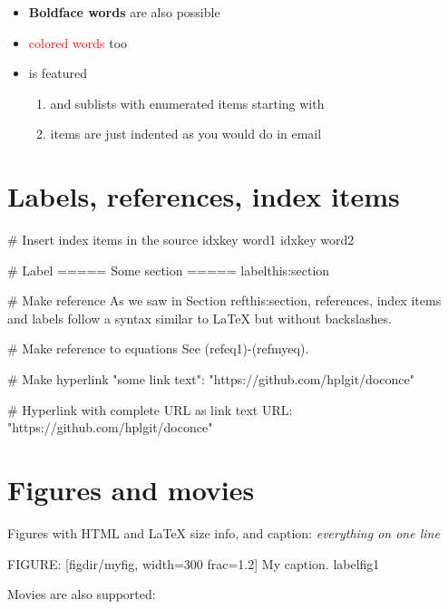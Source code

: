 \documentclass[%
twoside,                 %
draft,                   %
final,                   %
chapterprefix=true,      %
open=right               %
10pt]{book}
\newcounter{doconce:movie:counter}
\newenvironment{graybox1admon}[1][]{
\begin{graybox1mdframed}[frametitle=#1]
}
{
\end{graybox1mdframed}
}
\newcounter{doconce:exercise:counter}
\begin{document}
\begin{shadedquoteBlue}
\begin{itemize}
 \item \textbf{Boldface words} are also possible

 \item \textcolor{red}{colored words} too

 \item {} is featured
\begin{enumerate}

  \item and sublists with enumerated items starting with 

  \item items are just indented as you would do in email
\end{enumerate}

\noindent
\end{itemize}

\noindent
\section*{Labels, references, index items}

\bccq
# Insert index items in the source
idx{key word1} idx{key word2}

# Label
===== Some section =====
label{this:section}

# Make reference
As we saw in Section ref{this:section}, references, index
items and labels follow a syntax similar to LaTeX
but without backslashes.

# Make reference to equations
See (ref{eq1})-(ref{myeq}).

# Make hyperlink
"some link text": "https://github.com/hplgit/doconce"

# Hyperlink with complete URL as link text
URL: "https://github.com/hplgit/doconce"
\eccq

\section*{Figures and movies}


\begin{graybox1admon}[Important:]
Figures with HTML and {\LaTeX} size info, and caption: \emph{everything on one line}
\end{graybox1admon}



\bccq
FIGURE: [figdir/myfig, width=300 frac=1.2] My caption. label{fig1}
\eccq

Movies are also supported:


\end{shadedquoteBlue}
\end{document}
